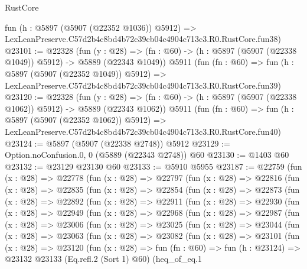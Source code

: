 \begin{lexlean}{RustCore}
\begin{coremodule}
    fun (h : @5897 (@5907 (@22352 @1036)) @5912) =>
    LexLeanPreserve.C57d2b4c8bd4b72c39cb04c4904c713c3.R0.RustCore.fun38)
@23101 := @22328
    (fun (y : @28) =>
    (fn : @60) -> (h : @5897 (@5907 (@22338 @1049)) @5912) -> @5889 (@22343 @1049))
    @5911
    (fun (fn : @60) =>
    fun (h : @5897 (@5907 (@22352 @1049)) @5912) =>
    LexLeanPreserve.C57d2b4c8bd4b72c39cb04c4904c713c3.R0.RustCore.fun39)
@23120 := @22328
    (fun (y : @28) =>
    (fn : @60) -> (h : @5897 (@5907 (@22338 @1062)) @5912) -> @5889 (@22343 @1062))
    @5911
    (fun (fn : @60) =>
    fun (h : @5897 (@5907 (@22352 @1062)) @5912) =>
    LexLeanPreserve.C57d2b4c8bd4b72c39cb04c4904c713c3.R0.RustCore.fun40)
@23124 := @5897 (@5907 (@22338 @2748)) @5912
@23129 := Option.noConfusion.{0, 0} (@5889 (@22343 @2748)) @60
@23130 := @1403 @60
@23132 := @23129 @23130 @60
@23133 := @5910 @5955
@23187 := @22759
    (fun (x : @28) =>
    @22778
      (fun (x : @28) =>
      @22797
        (fun (x : @28) =>
        @22816
          (fun (x : @28) =>
          @22835
            (fun (x : @28) =>
            @22854
              (fun (x : @28) =>
              @22873
                (fun (x : @28) =>
                @22892
                  (fun (x : @28) =>
                  @22911
                    (fun (x : @28) =>
                    @22930
                      (fun (x : @28) =>
                      @22949
                        (fun (x : @28) =>
                        @22968
                          (fun (x : @28) =>
                          @22987
                            (fun (x : @28) =>
                            @23006
                              (fun (x : @28) =>
                              @23025
                                (fun (x : @28) =>
                                @23044
                                  (fun (x : @28) =>
                                  @23063
                                    (fun (x : @28) =>
                                    @23082
                                      (fun (x : @28) =>
                                      @23101
                                        (fun (x : @28) =>
                                        @23120
                                          (fun (x : @28) =>
                                          fun (fn : @60) =>
                                          fun (h : @23124) =>
                                          @23132
                                            @23133
                                            (Eq.refl.{2} (Sort 1) @60)
                                            (heq_of_eq.{1}

\end{coremodule}
\end{lexlean}
